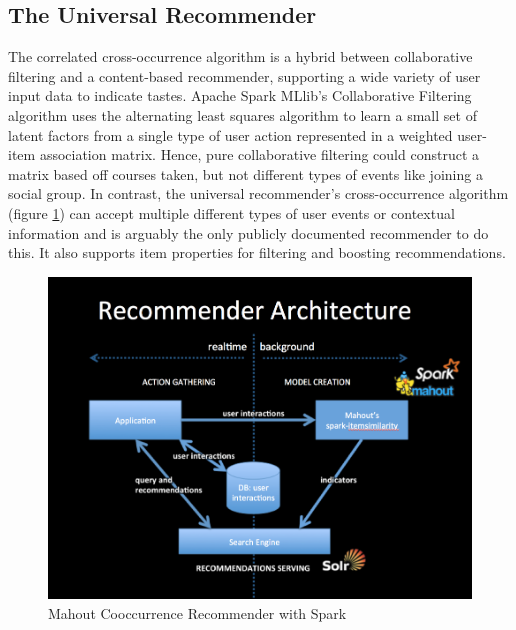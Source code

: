 \documentclass[12pt,journal]{IEEEtran}
\begin{document}
     \subsection{The Universal Recommender}
     
     The correlated cross-occurrence algorithm is a hybrid between collaborative filtering and a content-based recommender, supporting a wide variety of user input data to indicate tastes.  Apache Spark MLlib's Collaborative Filtering algorithm uses the alternating least squares algorithm to learn a small set of latent factors from a single type of user action represented in a weighted user-item association matrix.  Hence, pure collaborative filtering could construct a matrix based off courses taken, but not different types of events like joining a social group.  In contrast, the universal recommender's cross-occurrence algorithm (figure  \ref{fig:mahout_recommender_architecture}) can accept multiple different types of user events or contextual information and is arguably the only publicly documented recommender to do this.  It also supports item properties for filtering and boosting recommendations. \cite{UniversalRecommender}
     
     \begin{figure}[htbp]
    \begin{center}
    \includegraphics[width=1\columnwidth]{mahout_recommender_architecture}
    \end{center}
    \caption{Mahout Cooccurrence Recommender with Spark}
    \label{fig:mahout_recommender_architecture}
    \end{figure}
\end{document}
